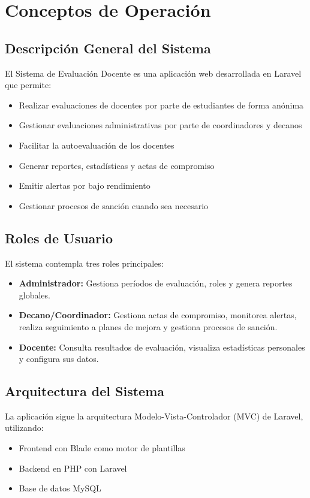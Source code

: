 \documentclass[12pt,a4paper]{article}
\begin{document}
\section{Conceptos de Operación}\label{sec:conceptos}
\subsection{Descripción General del Sistema}
El Sistema de Evaluación Docente es una aplicación web desarrollada en Laravel que permite:
\begin{itemize}
    \item Realizar evaluaciones de docentes por parte de estudiantes de forma anónima
    \item Gestionar evaluaciones administrativas por parte de coordinadores y decanos
    \item Facilitar la autoevaluación de los docentes
    \item Generar reportes, estadísticas y actas de compromiso
    \item Emitir alertas por bajo rendimiento
    \item Gestionar procesos de sanción cuando sea necesario
\end{itemize}

\subsection{Roles de Usuario}
El sistema contempla tres roles principales:
\begin{itemize}
    \item \textbf{Administrador:} Gestiona períodos de evaluación, roles y genera reportes globales.
    \item \textbf{Decano/Coordinador:} Gestiona actas de compromiso, monitorea alertas, realiza seguimiento a planes de mejora y gestiona procesos de sanción.
    \item \textbf{Docente:} Consulta resultados de evaluación, visualiza estadísticas personales y configura sus datos.
\end{itemize}

\subsection{Arquitectura del Sistema}
La aplicación sigue la arquitectura Modelo-Vista-Controlador (MVC) de Laravel, utilizando:
\begin{itemize}
    \item Frontend con Blade como motor de plantillas
    \item Backend en PHP con Laravel
    \item Base de datos MySQL
\end{itemize}
\end{document}

